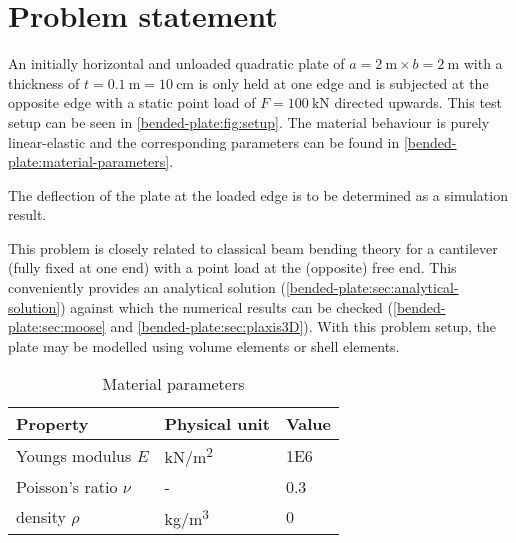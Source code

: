 \section{Problem statement}
\label{bended-plate:sec:problem-statement}

An initially horizontal and unloaded quadratic plate of $a = \qty{2}{\metre}
    \times b = \qty{2}{\metre}$ with a thickness of $t = \qty{0.1}{\metre} =
    \qty{10}{\centi\metre}$ is only held at one edge and is subjected at the
opposite edge with a static point load of $F = \qty{100}{\kilo\newton}$
directed upwards. This test setup can be seen in
\autoref{bended-plate:fig:setup}. The material behaviour is purely
linear-elastic and the corresponding parameters can be found in
\autoref{bended-plate:material-parameters}.

The deflection of the plate at the loaded edge is to be determined as a
simulation result.

This problem is closely related to classical beam bending theory for a
cantilever (fully fixed at one end) with a point load at the (opposite) free
end. This conveniently provides an analytical solution
(\autoref{bended-plate:sec:analytical-solution}) against which the numerical
results can be checked (\autoref{bended-plate:sec:moose} and
\autoref{bended-plate:sec:plaxis3D}). With this problem setup, the plate may be
modelled using volume elements or shell elements.

\begin{table}[htbp]
    \centering
    \caption{Material parameters}
    \label{bended-plate:material-parameters}
    \begin{tabularx}{\textwidth}{XYY}

        \hline

        Property              & Physical unit                                         & Value      \\

        \hline

        Youngs modulus $E$    & \si[per-mode = symbol]{\kilo\newton\per\square\metre} &
        \SI{1E6}{}                                                                                 \\

        Poisson's ratio $\nu$ & -                                                     & \SI{0.3}{} \\

        density $\rho$        & \si[per-mode = symbol]{\kilogram\per\cubic\metre}     & \SI{0}{}
        \\

        \hline
    \end{tabularx}
\end{table}

